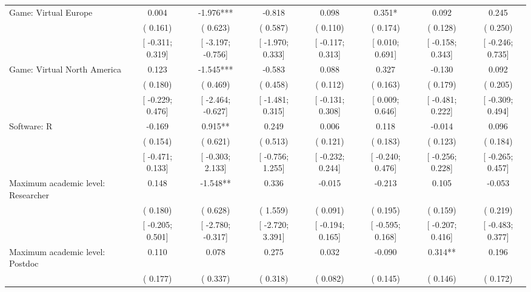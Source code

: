 \begin{tabular}{l*{7}{c}}
Game: Virtual Europe &    0.004   &   -1.976***   &   -0.818   &    0.098   &    0.351*   &    0.092   &    0.245   \\
                    &(    0.161)   &(    0.623)   &(    0.587)   &(    0.110)   &(    0.174)   &(    0.128)   &(    0.250)   \\
                    &[   -0.311;     0.319]   &[   -3.197;    -0.756]   &[   -1.970;     0.333]   &[   -0.117;     0.313]   &[    0.010;     0.691]   &[   -0.158;     0.343]   &[   -0.246;     0.735]   \\
Game: Virtual North America &    0.123   &   -1.545***   &   -0.583   &    0.088   &    0.327   &   -0.130   &    0.092   \\
                    &(    0.180)   &(    0.469)   &(    0.458)   &(    0.112)   &(    0.163)   &(    0.179)   &(    0.205)   \\
                    &[   -0.229;     0.476]   &[   -2.464;    -0.627]   &[   -1.481;     0.315]   &[   -0.131;     0.308]   &[    0.009;     0.646]   &[   -0.481;     0.222]   &[   -0.309;     0.494]   \\
Software: R &   -0.169   &    0.915**   &    0.249   &    0.006   &    0.118   &   -0.014   &    0.096   \\
                    &(    0.154)   &(    0.621)   &(    0.513)   &(    0.121)   &(    0.183)   &(    0.123)   &(    0.184)   \\
                    &[   -0.471;     0.133]   &[   -0.303;     2.133]   &[   -0.756;     1.255]   &[   -0.232;     0.244]   &[   -0.240;     0.476]   &[   -0.256;     0.228]   &[   -0.265;     0.457]   \\
Maximum academic level: Researcher &    0.148   &   -1.548**   &    0.336   &   -0.015   &   -0.213   &    0.105   &   -0.053   \\
                    &(    0.180)   &(    0.628)   &(    1.559)   &(    0.091)   &(    0.195)   &(    0.159)   &(    0.219)   \\
                    &[   -0.205;     0.501]   &[   -2.780;    -0.317]   &[   -2.720;     3.391]   &[   -0.194;     0.165]   &[   -0.595;     0.168]   &[   -0.207;     0.416]   &[   -0.483;     0.377]   \\
Maximum academic level: Postdoc &    0.110   &    0.078   &    0.275   &    0.032   &   -0.090   &    0.314**   &    0.196   \\
                    &(    0.177)   &(    0.337)   &(    0.318)   &(    0.082)   &(    0.145)   &(    0.146)   &(    0.172)   \\

\end{tabular}
